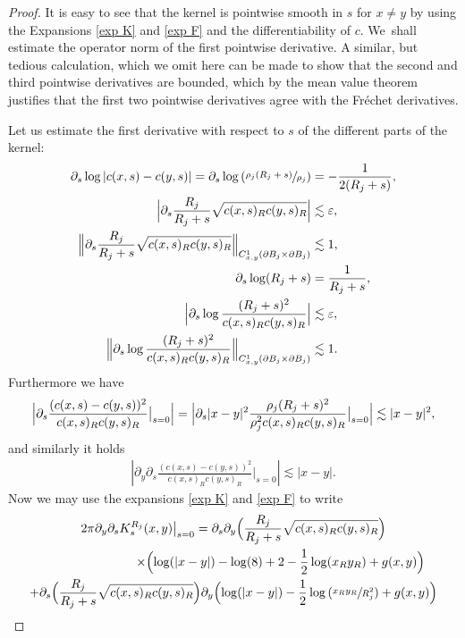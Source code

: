 \documentclass[10pt]{amsart}
\let\epsilon\varepsilon
\theoremstyle{definition}
\newcommand\Bnorm[1]{\Bigl\lVert #1\Bigr\rVert}
\newcommand\eq{=}
\let\de\partial
\let\eps\epsilon
\begin{document}
\begin{proof}
It is easy to see that the kernel is pointwise smooth in $s$ for $x\neq y$ by using the Expansions \eqref{exp K} and \eqref{exp F} and the differentiability of $c$. We~shall estimate the operator norm of the first pointwise derivative. A similar, but tedious calculation, which we omit here can be made to show that the second and third pointwise derivatives are bounded, which by the mean value theorem justifies that the first two pointwise derivatives agree with the Fréchet derivatives.

Let us estimate the first derivative with respect to $s$ of the different parts of the kernel:
\begin{align}
\de_s \log |c(x,s)-c(y,s)|\eq\de_s\log\left(\sfrac{\rho_j(R_j+s)}{\rho_j}\right)&\eq-\frac{1}{2(R_j+s)}\label{log c},\\
\Bigl|\de_s\frac{R_j}{R_j+s}\sqrt{c(x,s)_Rc(y,s)_R}\Bigr|&\lesssim \eps\label{deri prefactor 0},\\
\Bnorm{\de_s\frac{R_j}{R_j+s}\sqrt{c(x,s)_Rc(y,s)_R}}_{C_{x,y}^1(\de B_j\times \de B_j)}&\lesssim 1\label{deri prefactor},\\
\de_s\log(R_j+s)&\eq\frac{1}{R_j+s}\label{deri log R 0},\\
\Bigl|\de_s\log \frac{(R_j+s)^2}{c(x,s)_Rc(y,s)_R}\Bigr|&\lesssim \eps\label{deri log R 1},\\
\Bnorm{\de_s\log \frac{(R_j+s)^2}{c(x,s)_Rc(y,s)_R}}_{C_{x,y}^1(\de B_j\times \de B_j)}&\lesssim 1.\label{deri log R}
\end{align}
Furthermore we have
\begin{align}
\Bigl|\de_s\frac{(c(x,s)-c(y,s))^2}{c(x,s)_Rc(y,s)_R}\big|_{s=0}\Bigr| \eq \Bigl |\de_s|x-y|^2\frac{\rho_j(R_j+s)^2}{\rho_j^2c(x,s)_Rc(y,s)_R}\big|_{s=0} \Bigr|\lesssim |x-y|^2,\label{s deri bd}
\end{align}
and similarly it holds
\begin{align}
\left|\de_y\de_s\frac{(c(x,s)-c(y,s))^2}{c(x,s)_Rc(y,s)_R}\big|_{s=0}\right|\lesssim |x-y|.\label{s deri bd 2}
\end{align}
Now we may use the expansions \eqref{exp K} and \eqref{exp F} to write
\begin{multline*}
2\pi\de_y\de_sK_s^{R_j}(x,y)\big|_{s=0}\eq
 \de_s\de_y\Bigl(\frac{R_j}{R_j+s}\sqrt{c(x,s)_Rc(y,s)_R} \Bigr)\\ \shoveright{\times\Bigl(\log(|x-y|)-\log(8)+2-\frac{1}{2}\log(x_Ry_R)+g(x,y) \Bigr)}\\
+\de_s \Bigl(\frac{R_j}{R_j+s}\sqrt{c(x,s)_Rc(y,s)_R} \Bigr)\de_y \Bigl(\log(|x-y|)-\frac{1}{2}\log\left(\sfrac{x_Ry_R}{R_j^2}\right)+g(x,y) \Bigr)\\

\end{multline*}
\end{proof}
\end{document}
